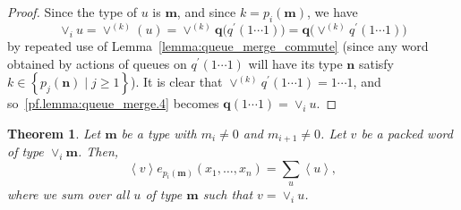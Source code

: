 \documentclass[reqno]{amsart}%
\newcommand{\0}{\phantom{c}}
\let\sumnonlimits\sum
\renewcommand{\sum}{\sumnonlimits\limits}
\theoremstyle{plain}
\newtheorem{thm}{Theorem}[section]
\theoremstyle{definition}
\numberwithin{equation}{section}
\begin{document}
\begin{proof}
Since the type of $u$ is $\mathbf{m}$, and since $k = p_{i}(\mathbf{m})$, we
have
\begin{equation}
\label{pf.lemma:queue_merge.4}\vee_{i} u = \vee^{(k)} (u) = \vee^{(k)}
\mathbf{q}\bigl( q^{\prime}(1 \dotsm1) \bigr) = \mathbf{q}\bigl( \vee^{(k)}
q^{\prime}(1 \dotsm1) \bigr)
\end{equation}
by repeated use of Lemma~\ref{lemma:queue_merge_commute} (since any word
obtained by actions of queues on $q^{\prime}(1 \dotsm1)$ will have its type
$\mathbf{n}$ satisfy $k \in\left\{  p_{j}(\mathbf{n}) \mid j \geq1 \right\}
$). It is clear that $\vee^{(k)} q^{\prime}(1 \dotsm1) = 1 \dotsm1$, and
so~\eqref{pf.lemma:queue_merge.4} becomes $\mathbf{q}(1 \dotsm1) = \vee_{i} u$.
\end{proof}

\begin{thm}
\label{thm:merge} Let $\mathbf{m}$ be a type with $m_{i} \neq0$ and $m_{i+1}
\neq0$. Let $v$ be a packed word of type $\vee_{i}\mathbf{m}$. Then,
\[
\left\langle v \right\rangle e_{p_{i}(\mathbf{m})}(x_{1}, \dotsc, x_{n}) =
\sum_{u} \left\langle u \right\rangle ,
\]
where we sum over all $u$ of type $\mathbf{m}$ such that $v = \vee_{i} u$.
\end{thm}
\end{document}
